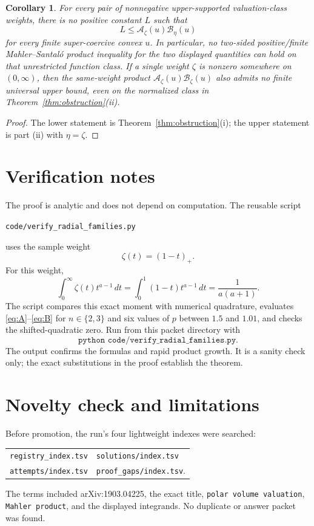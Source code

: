 \documentclass[11pt]{amsart}
\newtheorem{corollary}[theorem]{Corollary}
\theoremstyle{remark}
\newcommand{\A}{\mathcal A}
\newcommand{\B}{\mathcal B}
\begin{document}
\begin{corollary}
\label{cor:no-two-sided}
For every pair of nonnegative upper-supported valuation-class weights,
there is no positive constant $L$ such that
\[
       L\leq \A_\zeta(u)\B_\eta(u)
\]
for every finite super-coercive convex $u$.  In particular, no two-sided
positive/finite Mahler--Santal\'o product inequality for the two displayed
quantities can hold on that unrestricted function class.
If a single weight $\zeta$ is nonzero somewhere on $(0,\infty)$, then the
same-weight product $\A_\zeta(u)\B_\zeta(u)$ also admits no finite universal
upper bound, even on the normalized class in Theorem~\ref{thm:obstruction}(ii).
\end{corollary}

\begin{proof}
The lower statement is Theorem~\ref{thm:obstruction}(i); the upper statement
is part (ii) with $\eta=\zeta$.
\end{proof}

\section*{Verification notes}

The proof is analytic and does not depend on computation.  The reusable
script
\begin{center}
\nolinkurl{code/verify_radial_families.py}
\end{center}
uses the sample weight
\[
       \zeta(t)=(1-t)_+.
\]
For this weight,
\[
 \int_0^\infty\zeta(t)t^{a-1}\,dt
     =\int_0^1(1-t)t^{a-1}\,dt
     =\frac{1}{a(a+1)}.
\]
The script compares this exact moment with numerical quadrature, evaluates
\eqref{eq:A}--\eqref{eq:B} for $n\in\{2,3\}$ and six values of $p$ between
$1.5$ and $1.01$, and checks the shifted-quadratic zero.  Run from this
packet directory with
\[
 \texttt{python code/verify\_radial\_families.py}.
\]
The output confirms the formulas and rapid product growth.  It is a sanity
check only; the exact substitutions in the proof establish the theorem.

\section*{Novelty check and limitations}

Before promotion, the run's four lightweight indexes were searched:
\begin{center}
\begin{tabular}{ll}
\texttt{registry\_index.tsv} & \texttt{solutions/index.tsv}\\
\texttt{attempts/index.tsv} & \texttt{proof\_gaps/index.tsv}.
\end{tabular}
\end{center}
The terms included arXiv:1903.04225, the exact title, \texttt{polar volume
valuation}, \texttt{Mahler product}, and the displayed integrands.  No
duplicate or answer packet was found.
\end{document}
